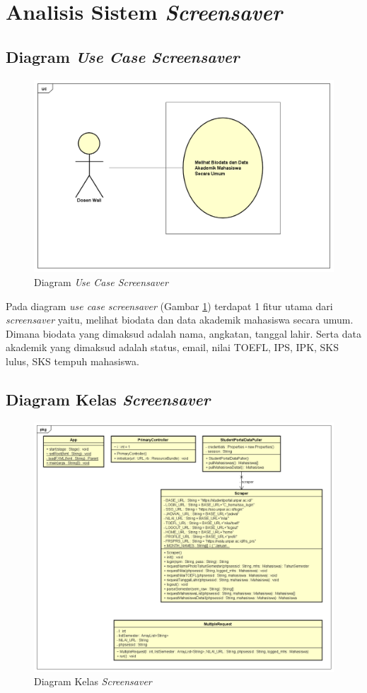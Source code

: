 \section{Analisis Sistem \textit{Screensaver}}

\subsection{Diagram \textit{Use Case Screensaver}}

\begin{figure}[H]
	\centering
	\includegraphics[scale=0.45]{Gambar/UseCase.png}
	\caption{Diagram \textit{Use Case Screensaver}}
	\label{fig:3_usecase_diagram}
\end{figure}
    
Pada diagram \textit{use case screensaver} (Gambar \ref{fig:3_usecase_diagram}) terdapat 1 fitur utama
dari \textit{screensaver} yaitu, melihat biodata dan data akademik mahasiswa secara umum. Dimana biodata yang dimaksud adalah nama, angkatan, tanggal lahir. Serta data akademik yang dimaksud adalah status, email, nilai TOEFL, IPS, IPK, SKS lulus, SKS tempuh mahasiswa.


\subsection{Diagram Kelas \textit{Screensaver}}

\begin{figure}[H]
	\centering
	\includegraphics[scale=0.45]{Gambar/ClassDiagram.png}
	\caption{Diagram Kelas \textit{Screensaver}}
	\label{fig:3_class_diagram}
\end{figure}

